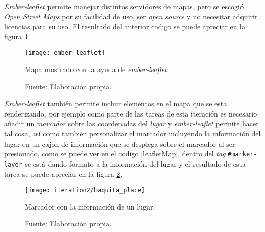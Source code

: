 \emph{Ember-leaflet} permite manejar distintos servidores de mapas, pero se escogió \emph{Open Street Maps} por su facilidad de uso, ser \emph{open source} y no necesitar adquirir licencias para su uso. El resultado del anterior codigo se puede apreciar en la figura \ref{fig:ember_leaflet}. \\

\begin{figure}[H]
     \begin{center}
       \texttt{[image: ember\_leaflet]}

       \caption{ Mapa mostrado con la ayuda de \emph{ember-leaflet}}
       \label{fig:ember_leaflet}
       \caption*{Fuente: Elaboración propia.}
     \end{center}
\end{figure}


\emph{Ember-leaflet} también permite incluir elementos en el mapa que se esta renderizando, por ejemplo como parte de las tareas de esta iteración es necesario añadir un \emph{marcador} sobre las coordenadas del \emph{lugar} y  \emph{ember-leaflet} permite hacer tal cosa, así como también personalizar el marcador incluyendo la información del lugar en un cajon de informaci\'on que se desplega sobre el marcador al ser presionado, como se puede ver en el codigo \ref{leafletMap}, dentro del \emph{tag} \verb|#marker-layer| se está dando formato a la información del lugar y el resultado de esta tarea se puede apreciar en la figura \ref{fig:baquita_place}. \\


\begin{figure}[H]
 \begin{center}
   \texttt{[image: iteration2/baquita\_place]}
   \caption{Marcador con la información de un lugar.}
   \label{fig:baquita_place}
   \caption*{Fuente: Elaboración propia.}
 \end{center}
\end{figure}









